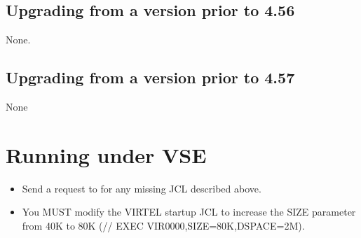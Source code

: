 \documentclass[letterpaper,10pt,english]{sphinxmanual}
\begin{document}

\section{Upgrading from a version prior to 4.56}
\label{\detokenize{Migration_Guide:upgrading-from-a-version-prior-to-4-56}}\label{\detokenize{Migration_Guide:index-6}}
None.


\section{Upgrading from a version prior to 4.57}
\label{\detokenize{Migration_Guide:upgrading-from-a-version-prior-to-4-57}}\label{\detokenize{Migration_Guide:index-7}}
None

\newpage


\chapter{Running under VSE}
\label{\detokenize{Migration_Guide:running-under-vse}}\label{\detokenize{Migration_Guide:index-8}}\begin{itemize}
\item {} 
Send a request to  for any missing JCL described above.

\item {} 
You MUST modify the VIRTEL startup JCL to increase the SIZE parameter from 40K to 80K (// EXEC VIR0000,SIZE=80K,DSPACE=2M).

\end{itemize}

\newpage

\end{document}
